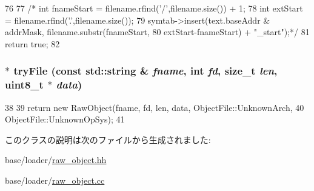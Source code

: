 \begin{DoxyCode}
76 {
77 /*    int fnameStart = filename.rfind('/',filename.size()) + 1;
78     int extStart = filename.rfind('.',filename.size());
79     symtab->insert(text.baseAddr & addrMask, filename.substr(fnameStart,
80                 extStart-fnameStart) + "_start");*/
81     return true;
82 }
\end{DoxyCode}
\hypertarget{classRawObject_a3b119de4852833fdf74dbb4b8e1e1eba}{
\subsubsection[{tryFile}]{ $\ast$ tryFile (const std::string \& {\em fname}, \/  int {\em fd}, \/  size\_\-t {\em len}, \/  uint8\_\-t $\ast$ {\em data})}}
\label{classRawObject_a3b119de4852833fdf74dbb4b8e1e1eba}



\begin{DoxyCode}
38 {
39     return new RawObject(fname, fd, len, data, ObjectFile::UnknownArch,
40             ObjectFile::UnknownOpSys);
41 }
\end{DoxyCode}


このクラスの説明は次のファイルから生成されました:\begin{DoxyCompactItemize}
\item 
base/loader/\hyperlink{raw__object_8hh}{raw\_\-object.hh}\item 
base/loader/\hyperlink{raw__object_8cc}{raw\_\-object.cc}\end{DoxyCompactItemize}
